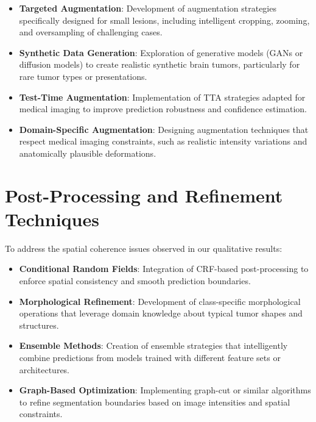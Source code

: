 \begin{itemize}
    \item \textbf{Targeted Augmentation}: Development of augmentation strategies specifically designed for small lesions, including intelligent cropping, zooming, and oversampling of challenging cases.
    
    \item \textbf{Synthetic Data Generation}: Exploration of generative models (GANs or diffusion models) to create realistic synthetic brain tumors, particularly for rare tumor types or presentations.
    
    \item \textbf{Test-Time Augmentation}: Implementation of TTA strategies adapted for medical imaging to improve prediction robustness and confidence estimation.
    
    \item \textbf{Domain-Specific Augmentation}: Designing augmentation techniques that respect medical imaging constraints, such as realistic intensity variations and anatomically plausible deformations.
\end{itemize}

\section{Post-Processing and Refinement Techniques}

To address the spatial coherence issues observed in our qualitative results:

\begin{itemize}
    \item \textbf{Conditional Random Fields}: Integration of CRF-based post-processing to enforce spatial consistency and smooth prediction boundaries.
    
    \item \textbf{Morphological Refinement}: Development of class-specific morphological operations that leverage domain knowledge about typical tumor shapes and structures.
    
    \item \textbf{Ensemble Methods}: Creation of ensemble strategies that intelligently combine predictions from models trained with different feature sets or architectures.
    
    \item \textbf{Graph-Based Optimization}: Implementing graph-cut or similar algorithms to refine segmentation boundaries based on image intensities and spatial constraints.
\end{itemize}

